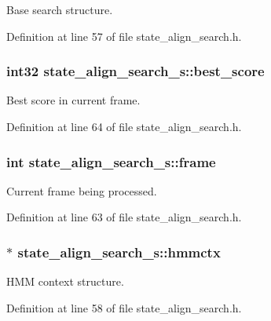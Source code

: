 Base search structure. 



Definition at line 57 of file state\+\_\+align\+\_\+search.\+h.

\subsubsection[{best\+\_\+score}]{\setlength{\rightskip}{0pt plus 5cm}int32 state\+\_\+align\+\_\+search\+\_\+s\+::best\+\_\+score}\label{structstate__align__search__s_a1810f343c6ae382f5ed0a5eb02d33037}


Best score in current frame. 



Definition at line 64 of file state\+\_\+align\+\_\+search.\+h.

\subsubsection[{frame}]{\setlength{\rightskip}{0pt plus 5cm}int state\+\_\+align\+\_\+search\+\_\+s\+::frame}\label{structstate__align__search__s_aa520abfdb4d0bca2b769f281839637a9}


Current frame being processed. 



Definition at line 63 of file state\+\_\+align\+\_\+search.\+h.

\subsubsection[{hmmctx}]{$\ast$ state\+\_\+align\+\_\+search\+\_\+s\+::hmmctx}\label{structstate__align__search__s_a683e76dbcc87cde89ca5d45b4b91c1e9}


H\+M\+M context structure. 



Definition at line 58 of file state\+\_\+align\+\_\+search.\+h.

